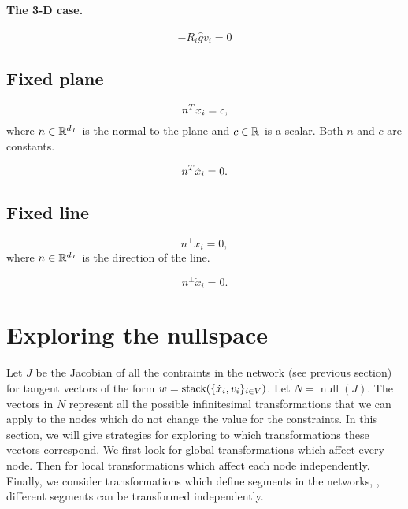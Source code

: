 \documentclass[12pt]{article}
\DeclareMathOperator{\nullspace}{null}
\newcommand{\dx}{\dot{x}}
\begin{document}
\paragraph{The 3-D case.}
\begin{equation}
  -R_i\hat{g} v_i=0  
\end{equation}

\subsection{Fixed plane}
\begin{equation}
  n^T x_i=c,  
\end{equation}
where $n\in\mathbb{R}^{d_T}{}$ is the normal to the plane and $c\in\mathbb{R}^{}{}$ is a scalar. Both $n$ and $c$ are constants.

\begin{equation}
  n\transpose \dx_i=0.  
\end{equation}

\subsection{Fixed line}
\begin{equation}
  n^\bot x_i=0,  
\end{equation}
where $n\in\mathbb{R}^{d_T}{}$ is the direction of the line.

\begin{equation}
  n^\bot \dx_i=0.  
\end{equation}



\section{Exploring the nullspace}
Let $J$ be the Jacobian of all the contraints in the network (see previous section) for tangent vectors of the form $w=\stack(\{\dx_i,v_i\}_\iV)$.
Let $N=\nullspace(J)$. The vectors in $N$ represent all the possible infinitesimal transformations that we can apply to the nodes which do not change the value for the constraints. In this section, we will give strategies for exploring to which transformations these vectors correspond. We first look for global transformations which affect every node. Then for local transformations which affect each node independently. Finally, we consider transformations which define segments in the networks, \ie, different segments can be transformed independently.
\end{document}
